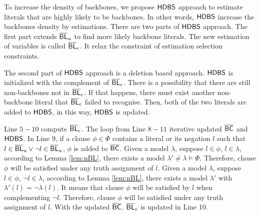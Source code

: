To increase the density of backbones, we propose $\textsf{HDBS}$ approach to estimate literals that are highly likely to be backbones. In other words, $\textsf{HDBS}$ increase the backbones density by estimations. There are two parts of $\textsf{HDBS}$ approach. The first part extends $\overline{\textsf{BL}}_u$ to find more likely backbone literals. The new estimation of variables is called $\overline{\textsf{BL}}_e$. It relax the constraint of estimation selection constraints.

The second part of $\textsf{HDBS}$ approach is a deletion based approach. $\textsf{HDBS}$ is initialized with the complement of $\overline{\textsf{BL}}_e$. There is a possibility that there are still non-backbones not in $\overline{\textsf{BL}}_e$. If that happens, there must exist another non-backbone literal that $\overline{\textsf{BL}}_e$ failed to recognise. Then, both of the two literals are added to $\textsf{HDBS}$, in this way, $\textsf{HDBS}$ is updated.

Line $5-10$ compute $\overline{\textsf{BL}}_e$. The loop from Line $8-11$ iterative updated $\overline{\textsf{BC}}$ and $\textsf{HDBS}$.
In Line 9, if a clause $\phi\in\Phi$ contains a literal or its negation $l$ such that $l\in\overline{\textsf{BL}}_u\vee\neg l\in\overline{\textsf{BL}}_u$, $\phi$ is added to $\overline{\textsf{BC}}$.
Given a model $\lambda$, suppose $l\in\phi$, $l\in\lambda$, according to Lemma \ref{lem:nBL}, there exists a model $\lambda'\neq\lambda\models\Phi$. Therefore, clause $\phi$ will be satisfied under any truth assignment of $l$.
Given a model $\lambda$, suppose $l\in\phi$, $\neg l\in\lambda$, according to Lemma \ref{lem:nBL}, there exists a model $\lambda'$ with $\lambda'(l)=\neg\lambda(l)$. It means that clause $\phi$ will be satisfied by $l$ when complementing $\neg l$. Therefore, clause $\phi$ will be satisfied under any truth assignment of $l$. With the updated $\overline{\textsf{BC}}$, $\overline{\textsf{BL}}_e$ is updated in Line 10.

